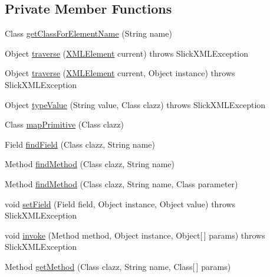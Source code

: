 \subsection*{Private Member Functions}
\begin{DoxyCompactItemize}
\item 
Class \mbox{\hyperlink{classorg_1_1newdawn_1_1slick_1_1util_1_1xml_1_1_object_tree_parser_a0c4c72b306807c49a12e60724c0eddb3}{get\+Class\+For\+Element\+Name}} (String name)
\item 
Object \mbox{\hyperlink{classorg_1_1newdawn_1_1slick_1_1util_1_1xml_1_1_object_tree_parser_a1adc20e7ba6879b553d681e59f182126}{traverse}} (\mbox{\hyperlink{classorg_1_1newdawn_1_1slick_1_1util_1_1xml_1_1_x_m_l_element}{X\+M\+L\+Element}} current)  throws Slick\+X\+M\+L\+Exception 
\item 
Object \mbox{\hyperlink{classorg_1_1newdawn_1_1slick_1_1util_1_1xml_1_1_object_tree_parser_aae6a4de36679329fe38f61bfbd4b9ad2}{traverse}} (\mbox{\hyperlink{classorg_1_1newdawn_1_1slick_1_1util_1_1xml_1_1_x_m_l_element}{X\+M\+L\+Element}} current, Object instance)  throws Slick\+X\+M\+L\+Exception 
\item 
Object \mbox{\hyperlink{classorg_1_1newdawn_1_1slick_1_1util_1_1xml_1_1_object_tree_parser_aec7415fa8c060d9a5841c7b54a50ff27}{type\+Value}} (String value, Class clazz)  throws Slick\+X\+M\+L\+Exception 
\item 
Class \mbox{\hyperlink{classorg_1_1newdawn_1_1slick_1_1util_1_1xml_1_1_object_tree_parser_a26a6afeae2913c5b30e54d78b2996fb7}{map\+Primitive}} (Class clazz)
\item 
Field \mbox{\hyperlink{classorg_1_1newdawn_1_1slick_1_1util_1_1xml_1_1_object_tree_parser_a8498dcdf85563156aa04fd5dbc6b3637}{find\+Field}} (Class clazz, String name)
\item 
Method \mbox{\hyperlink{classorg_1_1newdawn_1_1slick_1_1util_1_1xml_1_1_object_tree_parser_adeb37b83c1082cd794c9ec1ca5da9e9f}{find\+Method}} (Class clazz, String name)
\item 
Method \mbox{\hyperlink{classorg_1_1newdawn_1_1slick_1_1util_1_1xml_1_1_object_tree_parser_a712b6ea598e6983075d30056ff583274}{find\+Method}} (Class clazz, String name, Class parameter)
\item 
void \mbox{\hyperlink{classorg_1_1newdawn_1_1slick_1_1util_1_1xml_1_1_object_tree_parser_a9476f849ee25e45b5fa65229adf01cd2}{set\+Field}} (Field field, Object instance, Object value)  throws Slick\+X\+M\+L\+Exception 
\item 
void \mbox{\hyperlink{classorg_1_1newdawn_1_1slick_1_1util_1_1xml_1_1_object_tree_parser_a0c4e621ec62be84ee45a12a99714aa64}{invoke}} (Method method, Object instance, Object\mbox{[}$\,$\mbox{]} params)  throws Slick\+X\+M\+L\+Exception 
\item 
Method \mbox{\hyperlink{classorg_1_1newdawn_1_1slick_1_1util_1_1xml_1_1_object_tree_parser_a6d75c7a61198e54be45a307a9815c583}{get\+Method}} (Class clazz, String name, Class\mbox{[}$\,$\mbox{]} params)
\end{DoxyCompactItemize}
